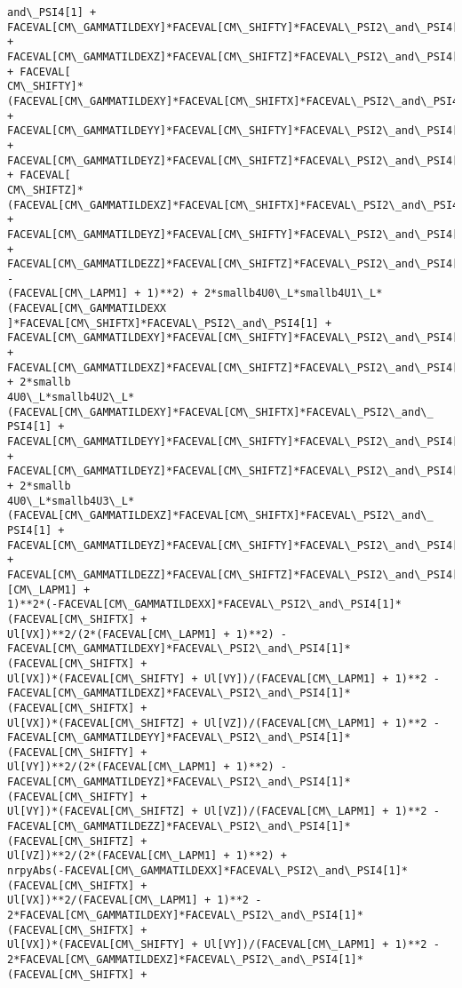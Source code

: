 \documentclass[landscape,letterpaper,10pt,english]{article}
\begin{document}
\begin{Verbatim}[commandchars=\\\{\}]
and\_PSI4[1] +
FACEVAL[CM\_GAMMATILDEXY]*FACEVAL[CM\_SHIFTY]*FACEVAL\_PSI2\_and\_PSI4[1] +
FACEVAL[CM\_GAMMATILDEXZ]*FACEVAL[CM\_SHIFTZ]*FACEVAL\_PSI2\_and\_PSI4[1]) + FACEVAL[
CM\_SHIFTY]*(FACEVAL[CM\_GAMMATILDEXY]*FACEVAL[CM\_SHIFTX]*FACEVAL\_PSI2\_and\_PSI4[1]
+ FACEVAL[CM\_GAMMATILDEYY]*FACEVAL[CM\_SHIFTY]*FACEVAL\_PSI2\_and\_PSI4[1] +
FACEVAL[CM\_GAMMATILDEYZ]*FACEVAL[CM\_SHIFTZ]*FACEVAL\_PSI2\_and\_PSI4[1]) + FACEVAL[
CM\_SHIFTZ]*(FACEVAL[CM\_GAMMATILDEXZ]*FACEVAL[CM\_SHIFTX]*FACEVAL\_PSI2\_and\_PSI4[1]
+ FACEVAL[CM\_GAMMATILDEYZ]*FACEVAL[CM\_SHIFTY]*FACEVAL\_PSI2\_and\_PSI4[1] +
FACEVAL[CM\_GAMMATILDEZZ]*FACEVAL[CM\_SHIFTZ]*FACEVAL\_PSI2\_and\_PSI4[1]) -
(FACEVAL[CM\_LAPM1] + 1)**2) + 2*smallb4U0\_L*smallb4U1\_L*(FACEVAL[CM\_GAMMATILDEXX
]*FACEVAL[CM\_SHIFTX]*FACEVAL\_PSI2\_and\_PSI4[1] +
FACEVAL[CM\_GAMMATILDEXY]*FACEVAL[CM\_SHIFTY]*FACEVAL\_PSI2\_and\_PSI4[1] +
FACEVAL[CM\_GAMMATILDEXZ]*FACEVAL[CM\_SHIFTZ]*FACEVAL\_PSI2\_and\_PSI4[1]) + 2*smallb
4U0\_L*smallb4U2\_L*(FACEVAL[CM\_GAMMATILDEXY]*FACEVAL[CM\_SHIFTX]*FACEVAL\_PSI2\_and\_
PSI4[1] + FACEVAL[CM\_GAMMATILDEYY]*FACEVAL[CM\_SHIFTY]*FACEVAL\_PSI2\_and\_PSI4[1] +
FACEVAL[CM\_GAMMATILDEYZ]*FACEVAL[CM\_SHIFTZ]*FACEVAL\_PSI2\_and\_PSI4[1]) + 2*smallb
4U0\_L*smallb4U3\_L*(FACEVAL[CM\_GAMMATILDEXZ]*FACEVAL[CM\_SHIFTX]*FACEVAL\_PSI2\_and\_
PSI4[1] + FACEVAL[CM\_GAMMATILDEYZ]*FACEVAL[CM\_SHIFTY]*FACEVAL\_PSI2\_and\_PSI4[1] +
FACEVAL[CM\_GAMMATILDEZZ]*FACEVAL[CM\_SHIFTZ]*FACEVAL\_PSI2\_and\_PSI4[1]))/((FACEVAL
[CM\_LAPM1] +
1)**2*(-FACEVAL[CM\_GAMMATILDEXX]*FACEVAL\_PSI2\_and\_PSI4[1]*(FACEVAL[CM\_SHIFTX] +
Ul[VX])**2/(2*(FACEVAL[CM\_LAPM1] + 1)**2) -
FACEVAL[CM\_GAMMATILDEXY]*FACEVAL\_PSI2\_and\_PSI4[1]*(FACEVAL[CM\_SHIFTX] +
Ul[VX])*(FACEVAL[CM\_SHIFTY] + Ul[VY])/(FACEVAL[CM\_LAPM1] + 1)**2 -
FACEVAL[CM\_GAMMATILDEXZ]*FACEVAL\_PSI2\_and\_PSI4[1]*(FACEVAL[CM\_SHIFTX] +
Ul[VX])*(FACEVAL[CM\_SHIFTZ] + Ul[VZ])/(FACEVAL[CM\_LAPM1] + 1)**2 -
FACEVAL[CM\_GAMMATILDEYY]*FACEVAL\_PSI2\_and\_PSI4[1]*(FACEVAL[CM\_SHIFTY] +
Ul[VY])**2/(2*(FACEVAL[CM\_LAPM1] + 1)**2) -
FACEVAL[CM\_GAMMATILDEYZ]*FACEVAL\_PSI2\_and\_PSI4[1]*(FACEVAL[CM\_SHIFTY] +
Ul[VY])*(FACEVAL[CM\_SHIFTZ] + Ul[VZ])/(FACEVAL[CM\_LAPM1] + 1)**2 -
FACEVAL[CM\_GAMMATILDEZZ]*FACEVAL\_PSI2\_and\_PSI4[1]*(FACEVAL[CM\_SHIFTZ] +
Ul[VZ])**2/(2*(FACEVAL[CM\_LAPM1] + 1)**2) +
nrpyAbs(-FACEVAL[CM\_GAMMATILDEXX]*FACEVAL\_PSI2\_and\_PSI4[1]*(FACEVAL[CM\_SHIFTX] +
Ul[VX])**2/(FACEVAL[CM\_LAPM1] + 1)**2 -
2*FACEVAL[CM\_GAMMATILDEXY]*FACEVAL\_PSI2\_and\_PSI4[1]*(FACEVAL[CM\_SHIFTX] +
Ul[VX])*(FACEVAL[CM\_SHIFTY] + Ul[VY])/(FACEVAL[CM\_LAPM1] + 1)**2 -
2*FACEVAL[CM\_GAMMATILDEXZ]*FACEVAL\_PSI2\_and\_PSI4[1]*(FACEVAL[CM\_SHIFTX] +

\end{Verbatim}
\end{document}
